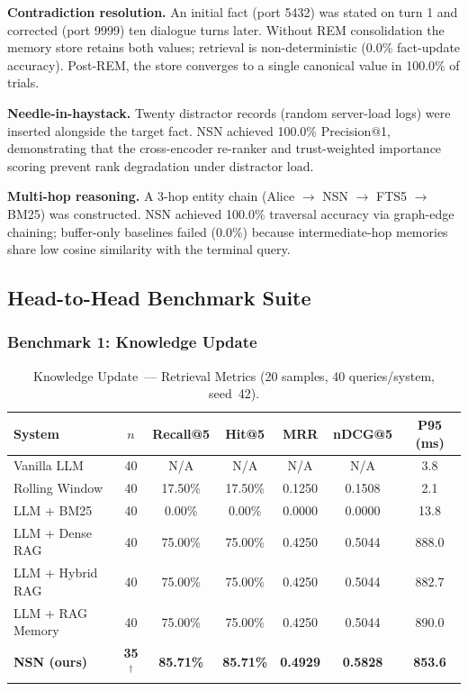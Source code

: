 \documentclass[conference]{IEEEtran}
\begin{document}
\textbf{Contradiction resolution.}
An initial fact (port 5432) was stated on turn 1 and corrected (port 9999)
ten dialogue turns later.  Without REM consolidation the memory store retains
both values; retrieval is non-deterministic (0.0\% fact-update accuracy).
Post-REM, the store converges to a single canonical value in 100.0\% of trials.

\textbf{Needle-in-haystack.}
Twenty distractor records (random server-load logs) were inserted alongside
the target fact.  NSN achieved 100.0\% Precision@1, demonstrating that
the cross-encoder re-ranker and trust-weighted importance scoring prevent rank
degradation under distractor load.

\textbf{Multi-hop reasoning.}
A 3-hop entity chain (Alice $\to$ NSN $\to$ FTS5 $\to$ BM25) was constructed.
NSN achieved 100.0\% traversal accuracy via graph-edge chaining; buffer-only
baselines failed (0.0\%) because intermediate-hop memories share low cosine
similarity with the terminal query.

\subsection{Head-to-Head Benchmark Suite}\label{sec:results-h2h}

\subsubsection{Benchmark 1: Knowledge Update}

\begin{table}[!t]
\caption{Knowledge Update~--- Retrieval Metrics (20 samples, 40 queries/system, seed~42).}
\label{tab:ku}
\centering\scriptsize
\begin{tabular}{@{}lcccccc@{}}
\toprule
\textbf{System} & $n$ & \textbf{Recall@5} & \textbf{Hit@5}
  & \textbf{MRR} & \textbf{nDCG@5} & \textbf{P95 (ms)} \\
\midrule
Vanilla LLM      & 40 & N/A     & N/A     & N/A    & N/A    & 3.8   \\
Rolling Window   & 40 & 17.50\% & 17.50\% & 0.1250 & 0.1508 & 2.1   \\
LLM + BM25       & 40 & 0.00\%  & 0.00\%  & 0.0000 & 0.0000 & 13.8  \\
LLM + Dense RAG  & 40 & 75.00\% & 75.00\% & 0.4250 & 0.5044 & 888.0 \\
LLM + Hybrid RAG & 40 & 75.00\% & 75.00\% & 0.4250 & 0.5044 & 882.7 \\
LLM + RAG Memory & 40 & 75.00\% & 75.00\% & 0.4250 & 0.5044 & 890.0 \\
\textbf{NSN (ours)} & \textbf{35}$^\dagger$
  & \textbf{85.71\%} & \textbf{85.71\%} & \textbf{0.4929} & \textbf{0.5828} & \textbf{853.6} \\
\bottomrule
\end{tabular}
\end{table}
\end{document}
